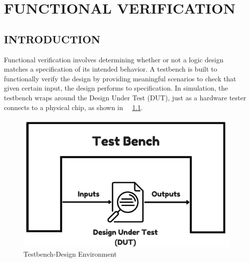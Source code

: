 \chapter{FUNCTIONAL VERIFICATION}
\label{chap:func_verif}

\section{INTRODUCTION}
Functional verification involves determining whether or not a logic design matches a specification of its intended behavior. A testbench is built to functionally verify the design by providing meaningful scenarios to check that given certain input, the design performs to specification. In simulation, the testbench wraps around the Design Under Test (DUT), just as a hardware tester connects to a physical chip, as shown in ~\figurename~{\ref{fig:testbench.png}}.
\vspace{10pt}
\begin{figure}[h!]
\centering
\includegraphics[scale=0.6]{./figures/testbench.png}
\caption{Testbench-Design Environment}
\label{fig:testbench.png}
\end{figure}

